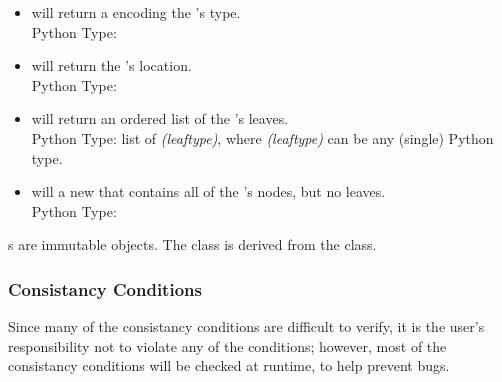 \documentclass[11pt]{article}
\begin{document}
      \begin{itemize}
    
        \item {} will return a  encoding the
        's type. \\
        Python Type: 
    
        \item {} will return the 's
        location. \\
        Python Type: 

        \item {} will return an ordered list of the
        's leaves. \\
        Python Type: list of \emph{(leaftype)}, where
        \emph{(leaftype)} can be any (single) Python type.

        \item {} will a new  that contains
        all of the 's nodes, but no leaves. \\
        Python Type: 
    
      \end{itemize}

      \noindent {}s are immutable objects.  The
       class is derived from the  class.

    \subsubsection{Consistancy Conditions}

      Since many of the consistancy conditions are difficult to
      verify, it is the user's responsibility not to violate any of
      the conditions; however, most of the consistancy conditions will
      be checked at runtime, to help prevent bugs.
\end{document}
